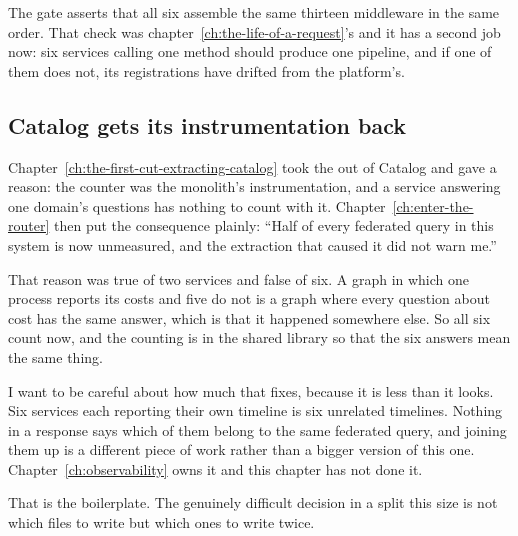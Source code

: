 The gate asserts that all six assemble the same thirteen middleware in the same
order. That check was chapter~\ref{ch:the-life-of-a-request}'s and it has a
second job now: six services calling one method should produce one pipeline, and
if one of them does not, its registrations have drifted from the platform's.

\subsection*{Catalog gets its instrumentation back}

%
Chapter~\ref{ch:the-first-cut-extracting-catalog} took the
 out of Catalog and gave a reason: the counter was the
monolith's instrumentation, and a service answering one domain's questions has
nothing to count with it. Chapter~\ref{ch:enter-the-router} then put the
consequence plainly: \enquote{Half of every federated query in this system is
now unmeasured, and the extraction that caused it did not warn me.}

That reason was true of two services and false of six. A graph in which one
process reports its costs and five do not is a graph where every question about
cost has the same answer, which is that it happened somewhere else. So all six
count now, and the counting is in the shared library so that the six answers
mean the same thing.

I want to be careful about how much that fixes, because it is less than it
looks. Six services each reporting their own timeline is six unrelated
timelines. Nothing in a response says which of them belong to the same federated
query, and joining them up is a different piece of work rather than a bigger
version of this one. Chapter~\ref{ch:observability} owns it and this chapter has
not done it.

\medskip
That is the boilerplate. The genuinely difficult decision in a split this size
is not which files to write but which ones to write twice.

%
